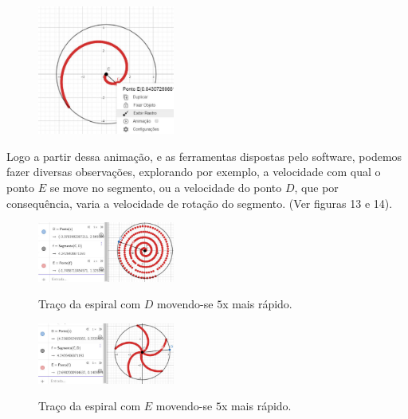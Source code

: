 \documentclass[twoside,a4paper,10pt]{article}
\begin{document}
\begin{enumerate}
\begin{figure}[!h]
			{\includegraphics[width=0.4\textwidth]{c4}}
		\end{figure}
\end{enumerate}

Logo a partir dessa animação, e as ferramentas dispostas pelo software, podemos fazer diversas observações, explorando por exemplo, a velocidade com qual o ponto $E$ se move no segmento, ou a velocidade do ponto $D$, que por consequência, varia a velocidade de rotação do segmento. (Ver figuras 13 e 14).
\clearpage

\begin{figure}[!h]
	{\includegraphics[width=0.4\textwidth]{c5}}
		\caption{Traço da espiral com $D$ movendo-se $5$x mais rápido.}
	{\includegraphics[width=0.4\textwidth]{c6}}
		\caption{Traço da espiral com $E$ movendo-se $5$x mais rápido.}
\end{figure}
\end{document}
